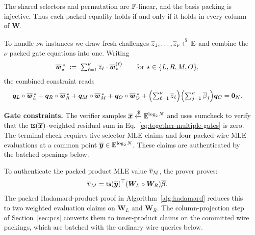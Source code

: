 The shared selectors and permutation are \({\mathbb{F}}\)-linear,
and the basis packing is injective.
Thus each packed equality holds if and only if it holds in
every column of \(\bm W\).

To handle \(\nu\kappa\) instances we draw fresh challenges
\(\overline{z}_1,\dots,\overline{z}_\nu \mathrel{\xleftarrow{\$}} \mathbb{E}\) and combine the
\(\nu\) packed gate equations into one. Writing
\[
    \overline{\bm w}_\star^{\,z}
    \;:=\;\textstyle\sum_{\ell=1}^{\nu}\overline{z}_\ell\cdot\overline{\bm w}_\star^{(\ell)}
    \qquad\text{for }\star\in\{L,R,M,O\},
\]
the combined constraint reads
\begin{align*}
    \bm q_L\circ\overline{\bm w}_L^{\,z}
    +\bm q_R\circ\overline{\bm w}_R^{\,z}
    +\bm q_M\circ\overline{\bm w}_M^{\,z}
    +\bm q_O\circ\overline{\bm w}_O^{\,z}
    +\Bigl(\textstyle\sum_{\ell=1}^{\nu}\overline{z}_\ell\Bigr)
     \Bigl(\textstyle\sum_{j=1}^{\kappa}\overline{\beta}_j\Bigr)\bm q_C
       =\bm0_N.
\end{align*}

\smallskip\noindent\textbf{Gate constraints.}
The verifier samples
\(\overline{\bm x}\mathrel{\xleftarrow{\$}}\mathbb{E}^{\log_2N}\)
and uses sumcheck to verify that the
\({\sf ts}(\overline{\bm x})\)-weighted residual sum in
Eq.~\eqref{eq:together-multiple-gates} is zero.
The terminal check requires five selector MLE claims
and four packed-wire MLE evaluations at a common point
\(\overline{\bm y} \in \mathbb{E}^{\log_2 N}\).
These claims are authenticated by the batched openings below.

To authenticate the packed product MLE value \(\overline{v}_M\),
the prover proves:
\begin{equation}
    \overline{v}_M
    =
    {\sf ts}(\overline{\bm y})^\top
    (\bm W_L\circ\bm W_R)\overline{\bm\beta}.
\label{eq:together-multiple-product-opening}
\end{equation}
The packed Hadamard-product proof in Algorithm~\ref{alg:hadamard}
reduces this to two weighted evaluation claims on
\(\bm W_L\) and \(\bm W_R\).
The column-projection step of Section~\ref{sec:pcs} converts
them to inner-product claims on the committed wire packings,
which are batched with the ordinary wire queries below.

